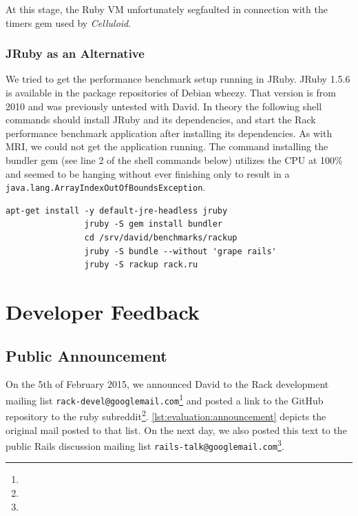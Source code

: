 
		At this stage, the Ruby \ac{VM} unfortunately segfaulted in connection
		with the timers gem used by \emph{Celluloid}.

		\subsubsection{JRuby as an Alternative}

			We tried to get the performance benchmark setup running in JRuby.
			JRuby 1.5.6 is available in the package repositories of Debian
			wheezy. That version is from 2010 and was previously untested with
			David. In theory the following shell commands should install JRuby
			and its dependencies, and start the Rack performance benchmark
			application after installing its dependencies. As with \ac{MRI}, we
			could not get the application running. The command installing the
			bundler gem (see line 2 of the shell commands below) utilizes the
			\ac{CPU} at 100\% and seemed to be hanging without ever finishing
			only to result in a
			\texttt{java.lang.ArrayIndexOutOfBoundsException}.

			\begin{lstlisting}[gobble=8]
				apt-get install -y default-jre-headless jruby
				jruby -S gem install bundler
				cd /srv/david/benchmarks/rackup
				jruby -S bundle --without 'grape rails'
				jruby -S rackup rack.ru
			\end{lstlisting}

\section{Developer Feedback}
\label{cha:rawdata:feedback}

	\subsection{Public Announcement}
	\label{cha:rawdata:feedback:announcement}

		On the 5th of February 2015, we announced David to the Rack development
		mailing list
		\texttt{rack-devel@googlemail.com}\footnote{\urlDavidMlRack} and posted
		a link to the GitHub repository to the ruby
		subreddit\footnote{\urlDavidReddit}.
		\autoref{lst:evaluation:announcement} depicts the original mail posted
		to that list. On the next day, we also posted this text to the public
		Rails discussion mailing list
		\texttt{rails-talk@googlemail.com}\footnote{\urlDavidMlRails}.
	
